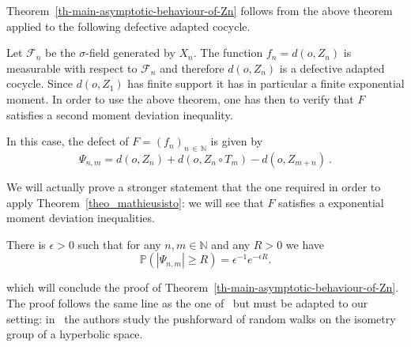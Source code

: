 \documentclass[AHL,Unicode,longabstracts,published]{cedram}
\newcommand{\bP}{\mathbb{P}}
\newcommand{\cF}{\mathcal{F}}
\newcommand{\N}{\mathbb{N}}
\newcommand{\NN}{\mathbb{N}}
\begin{document}
Theorem~\ref{th-main-asymptotic-behaviour-of-Zn} follows from the above theorem applied to the following defective adapted cocycle.


Let $\cF_n$ be the $\sigma$-field generated by $X_n$. The function $f_n=d(o,Z_n)$ is measurable with respect to $\cF_n$ and therefore $d(o,Z_n)$ is a defective adapted cocycle. Since $d(o,Z_1)$ has finite support it has in particular a finite exponential moment. In order to use the above theorem, one has then to verify that $F$ satisfies a second moment deviation inequality.

In this case, the defect of $F=(f_n)_{n\,\in\,\N}$ is given by
\begin{equation}
\Psi_{n,m} = d\left(o,Z_n\right) + d\left(o,Z_n \circ T_m\right) - d\left(o, Z_{m+n}\right) \ .
\end{equation}

We will actually prove a stronger statement that the one required in order to apply Theorem~\ref{theo_mathieusisto}: we will see that $F$ satisfies a exponential moment deviation inequalities.

\begin{prop}\label{prop_expdevinequalitiesdefec}
There is $\epsilon > 0$ such that for any $n,m \in \NN$ and any $R > 0$ we have
\[
\bP\left(\left|\Psi_{n,m}\right| \geq R\right) = \epsilon^{-1} e^{-\epsilon R} .
\]
\end{prop}
\noindent which will conclude the proof of Theorem~\ref{th-main-asymptotic-behaviour-of-Zn}. The proof follows the same line as the one of~\cite{artmathieusisto} but must be adapted to our setting: in~\cite{artmathieusisto} the authors study the pushforward of random walks on the isometry group of a hyperbolic space.
\end{document}

